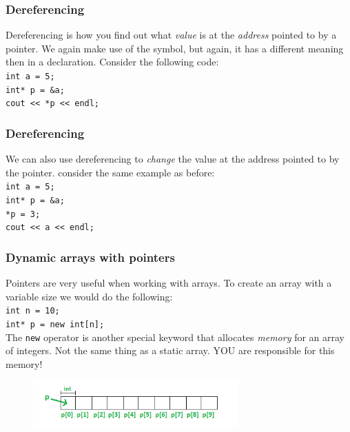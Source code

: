 \documentclass{if-beamer}
\begin{document}
\begin{frame}
\frametitle{Dereferencing}
Dereferencing is how you find out what \textit{value} is at the
\textit{address} pointed to by a pointer. We again make use of the
\texttt{\textasteriskcentered} symbol, but again, it has a different
meaning then in a declaration. Consider the following code:\\
\vspace{5pt}
\texttt{int a = 5;}\\
\texttt{int* p = \&a;}\\
\texttt{cout << *p << endl;}\\
\end{frame}

\begin{frame}
\frametitle{Dereferencing}
We can also use dereferencing to \textit{change} the value at the
address pointed to by the pointer. consider the same example as before:\\
\vspace{5pt}
\texttt{int a = 5;}\\
\texttt{int* p = \&a;}\\
\texttt{*p = 3;}\\
\texttt{cout << a << endl;}\\
\end{frame}

\begin{frame}
\frametitle{\LARGE Dynamic arrays with pointers}
Pointers are very useful when working with arrays. To create an array
with a variable size we would do the following: \\
\vspace{5pt}
\texttt{int n = 10;}\\
\texttt{int* p = new int[n];}\\
\vspace{5pt}
The \texttt{new} operator is another special keyword that allocates
\textit{memory} for an array of integers. Not the same thing as a
static array. YOU are responsible for this memory!
\begin{figure}
\center
\includegraphics[width=0.7\textwidth]{figures/pointerarray.png}
\end{figure}
\end{frame}
\end{document}
